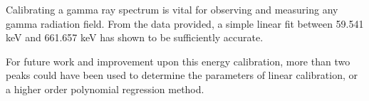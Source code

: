 Calibrating a gamma ray spectrum is vital for observing
and measuring any gamma radiation field. From the data
provided, a simple linear fit between 59.541 keV and 661.657 keV
has shown to be sufficiently accurate.

For future work and improvement upon this energy calibration, more than
two peaks could have been used to determine the parameters of linear
calibration, or a higher order polynomial regression method.
